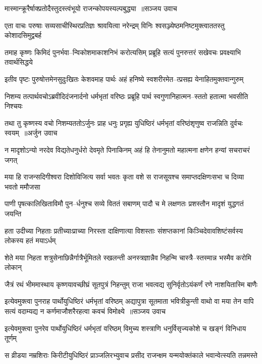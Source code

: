 \twolineshloka
{मास्मान्क्रूरैर्षाक्प्रतोदैस्तुदस्त्वंभूयो राजन्कोपयस्यल्पबुद्ध्या ॥सञ्जय उवाच}
{}


\twolineshloka
{एता वाचः परुषाः सव्यसाचीस्थिरप्रतिज्ञः श्रावयित्वा नरेन्द्रम्}
{विनिः श्वसञ्ज्येष्ठमनिष्टमुक्त्वाततस्तु कोशादसिमुद्वबर्ह}


\twolineshloka
{तमाह कृष्णः किमिदं पुनर्भवा--न्विकोशमाकाशनिभं करोत्यसिम्}
{प्रब्रूहि सत्यं पुनरुत्तरं सखेवचः प्रवक्ष्याभि तवार्थसिद्धये}


\twolineshloka
{इतीव पृष्टः पुरुषोत्तमेनसुदुःखितः केशवमाह पार्थः}
{अहं हनिष्ये स्वशरीरमेत--त्प्रसह्य येनाहितमुक्तवान्गुरुम्}


\twolineshloka
{निशम्य तत्पार्थवचोऽब्रवीदिदंजनार्दनो धर्मभृतां वरिष्ठः}
{प्रब्रूहि पार्थ स्वगुणानिहात्मन--स्ततो हतात्मा भवसीति निश्चयः}


\threelineshloka
{तथा तु कृष्णस्य वचो निशम्यततोऽर्जुनः प्राह धनुः प्रगृह्य}
{युधिष्ठिरं धर्मभृतां वरिष्ठंशृणुष्व राजन्निति दुर्वचः स्वयम् ॥अर्जुन उवाच}
{}


\twolineshloka
{न मादृशोऽन्यो नरदेव विद्यतेधनुर्धरो देवमृते पिनाकिनम्}
{अहं हि तेनानुमतो महात्मना क्षणेन हन्यां सचराचरं जगत्}


\twolineshloka
{मया हि राजन्सदिगीश्वरा दिशोविजित्य सर्वा भवतः कृता वशे}
{स राजसूयश्च समाप्तदक्षिणःसभा च दिव्या भवतो ममौजसा}


\twolineshloka
{पाणी पृषत्कालिखिताविमौ पुन--र्धनुश्च सव्ये विततं सबाणम्}
{पादौ च मे लक्षणतः प्रशस्तौन मादृशं युद्धगतं जयन्ति}


\twolineshloka
{हता उदीच्या निहताः प्रतीच्याःप्राच्या निरस्ता दाक्षिणात्या विशस्ताः}
{संशप्तकानां किञ्चिदेवावशिष्टंसर्वस्य लोकस्य हतं मयाऽर्धम्}


\twolineshloka
{शेते मया निहता शत्रुसेनाछिन्नैर्गात्रैर्भूमितले स्खलन्ती}
{अनस्त्रज्ञान्नैव निहन्मि चास्त्रै--स्तस्मान्न भस्मैव करोमि लोकान्}


\twolineshloka
{जैत्रं रथं भीममास्थाय कृष्णयावच्छीघ्रं सूतपुत्रं निहन्तुम्}
{राजा भवत्वद्य सुनिर्वृतोऽयंकर्णं रणे नाशयितास्मि बाणैः}


\fourlineindentedshloka
{इत्येवमुक्त्वा पुनराह पार्थोयुधिष्ठिरं धर्मभृतां वरिष्ठम्}
{अद्यापुत्रा सूतमाता भवित्रीकुन्ती वाथो वा मया तेन वापि}
{सत्यं वदाम्यद्य न कर्णमाजौशरैरहत्वा कवचं विमोक्ष्ये ॥सञ्जय उवाच}
{}


\twolineshloka
{इत्येवमुक्त्वा पुनरेव पार्थोयुधिष्ठिरं धर्मभृतां वरिष्ठम्}
{विमुच्य शस्त्राणि धनुर्विसृज्यकोशे च खङ्गं विनिधाय तूर्णम्}


\twolineshloka
{स व्रीडया नम्रशिराः किरीटीयुधिष्ठिरं प्राञ्जलिरभ्युवाच}
{प्रसीद राजन्क्षम यन्मयोक्तंकाले भवान्वेत्स्यति तन्नमस्ते}


